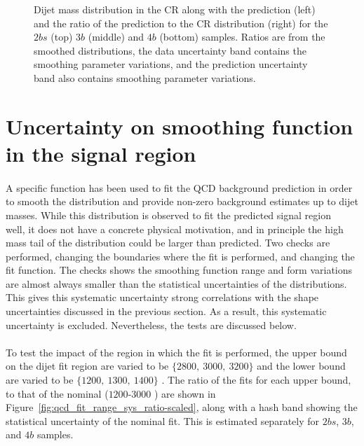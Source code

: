 \begin{figure}[htbp!]
\begin{center}
\caption{Dijet mass distribution in the CR along with the prediction (left) and the ratio of the prediction to the CR distribution (right)  for the $2bs$ (top) $3b$ (middle) and $4b$ (bottom) samples.  Ratios are from the smoothed distributions, the data uncertainty band contains the smoothing parameter variations, and the prediction uncertainty band also contains smoothing parameter variations.}
\label{fig:qcd_shape_fit}
\end{center}
\end{figure}

\section{Uncertainty on smoothing function in the signal region}
\label{unc-smooth-qcd-in-sr}

\paragraph{}
A specific function has been used to fit the QCD background prediction in order to smooth the distribution and provide non-zero background estimates up to dijet masses.  
While this distribution is observed to fit the predicted signal region \mtwoJ~ well, it does not have a concrete physical motivation, and in principle the high mass tail of the distribution could be larger than predicted.
Two checks are performed, changing the boundaries where the fit is performed, and changing the fit function.
The checks shows the smoothing function range and form variations are almost always smaller than the statistical uncertainties of the distributions.
This gives this systematic uncertainty strong correlations with the shape uncertainties discussed in the previous section.
As a result, this systematic uncertainty is excluded.
Nevertheless, the tests are discussed below.

\paragraph{}
To test the impact of the region in which the fit is performed, the upper bound on the dijet fit region are varied to be $\{2800,\ 3000,\ 3200\}$ \GeV and the lower bound are varied to be $\{1200,\ 1300,\ 1400\}$ \GeV.  
The ratio of the fits for each upper bound, to that of the nominal ($1200$-$3000$ \GeV) are shown in Figure~\ref{fig:qcd_fit_range_sys_ratio-scaled}, along with a hash band showing the statistical uncertainty of the nominal fit.
This is estimated separately for $2bs$, $3b$, and $4b$ samples.

